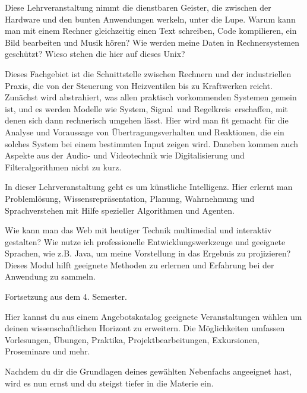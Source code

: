 
Diese Lehrveranstaltung nimmt die dienstbaren Geister, die zwischen der Hardware und den bunten Anwendungen werkeln, unter die Lupe.
Warum kann man mit einem Rechner gleichzeitig einen Text schreiben, Code kompilieren, ein Bild bearbeiten und Musik hören?
Wie werden meine Daten in Rechnersystemen geschützt?
Wieso stehen die hier auf dieses Unix?

Dieses Fachgebiet ist die Schnittstelle zwischen Rechnern und der industriellen Praxis, die von der Steuerung von Heizventilen bis zu Kraftwerken reicht.
Zunächst wird abstrahiert, was allen praktisch vorkommenden Systemen gemein ist, und es werden Modelle wie \glqq System\grqq, \glqq Signal\grqq\ und \glqq Regelkreis\grqq\ erschaffen, mit denen sich dann rechnerisch umgehen lässt.
Hier wird man fit gemacht für die Analyse und Voraussage von Übertragungsverhalten und Reaktionen, die ein solches System bei einem bestimmten Input zeigen wird.
Daneben kommen auch Aspekte aus der Audio- und Videotechnik wie Digitalisierung und Filteralgorithmen nicht zu kurz.

In dieser Lehrveranstaltung geht es um künstliche Intelligenz.
Hier erlernt man Problemlösung, Wissensrepräsentation, Planung, Wahrnehmung und Sprachverstehen mit Hilfe spezieller Algorithmen und Agenten.

Wie kann man das Web mit heutiger Technik multimedial und interaktiv gestalten?
Wie nutze ich professionelle Entwicklungswerkzeuge und geeignete Sprachen, wie z.B. Java, um meine Vorstellung in das Ergebnis zu projizieren?
Dieses Modul hilft geeignete Methoden zu erlernen und Erfahrung bei der Anwendung zu sammeln.

Fortsetzung aus dem 4. Semester.

Hier kannst du aus einem Angebotskatalog geeignete Veranstaltungen wählen um deinen wissenschaftlichen Horizont zu erweitern.
Die Möglichkeiten umfassen Vorlesungen, Übungen, Praktika, Projektbearbeitungen, Exkursionen, Proseminare und mehr.

Nachdem du dir die Grundlagen deines gewählten Nebenfachs angeeignet hast, wird es nun ernst und du steigst tiefer in die Materie ein.


